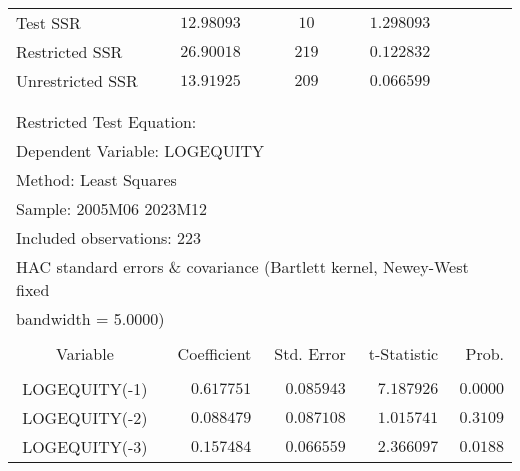 \begin{tabular}{lrrrr}
\multicolumn{1}{l}{Test SSR}&\multicolumn{1}{c}{$12.98093$}&\multicolumn{1}{c}{$10$}&\multicolumn{1}{c}{$1.298093$}&\multicolumn{1}{c}{}\\
\multicolumn{1}{l}{Restricted SSR}&\multicolumn{1}{c}{$26.90018$}&\multicolumn{1}{c}{$219$}&\multicolumn{1}{c}{$0.122832$}&\multicolumn{1}{c}{}\\
\multicolumn{1}{l}{Unrestricted SSR}&\multicolumn{1}{c}{$13.91925$}&\multicolumn{1}{c}{$209$}&\multicolumn{1}{c}{$0.066599$}&\multicolumn{1}{c}{}\\
[4.5pt] \hline \\ [-4.5pt]
\multicolumn{1}{c}{}&\multicolumn{1}{c}{}&\multicolumn{1}{c}{}&\multicolumn{1}{c}{}&\multicolumn{1}{c}{}\\
\multicolumn{2}{l}{Restricted Test Equation:}&\multicolumn{1}{c}{}&\multicolumn{1}{c}{}&\multicolumn{1}{c}{}\\
\multicolumn{3}{l}{Dependent Variable: LOGEQUITY}&\multicolumn{1}{c}{}&\multicolumn{1}{c}{}\\
\multicolumn{2}{l}{Method: Least Squares}&\multicolumn{1}{c}{}&\multicolumn{1}{c}{}&\multicolumn{1}{c}{}\\
\multicolumn{2}{l}{Sample: 2005M06 2023M12}&\multicolumn{1}{c}{}&\multicolumn{1}{c}{}&\multicolumn{1}{c}{}\\
\multicolumn{2}{l}{Included observations: 223}&\multicolumn{1}{c}{}&\multicolumn{1}{c}{}&\multicolumn{1}{c}{}\\
\multicolumn{6}{l}{HAC standard errors \& covariance (Bartlett kernel, Newey-West fixed}\\
\multicolumn{2}{l}{bandwidth = 5.0000)}&\multicolumn{1}{c}{}&\multicolumn{1}{c}{}&\multicolumn{1}{c}{}\\
[4.5pt] \hline \\ [-4.5pt]
\multicolumn{1}{c}{Variable}&\multicolumn{1}{r}{Coefficient}&\multicolumn{1}{r}{Std. Error}&\multicolumn{1}{r}{t-Statistic}&\multicolumn{1}{r}{Prob.}\\
[4.5pt] \hline \\ [-4.5pt]
\multicolumn{1}{c}{LOGEQUITY(-1)}&\multicolumn{1}{r}{$0.617751$}&\multicolumn{1}{r}{$0.085943$}&\multicolumn{1}{r}{$7.187926$}&\multicolumn{1}{r}{$0.0000$}\\
\multicolumn{1}{c}{LOGEQUITY(-2)}&\multicolumn{1}{r}{$0.088479$}&\multicolumn{1}{r}{$0.087108$}&\multicolumn{1}{r}{$1.015741$}&\multicolumn{1}{r}{$0.3109$}\\
\multicolumn{1}{c}{LOGEQUITY(-3)}&\multicolumn{1}{r}{$0.157484$}&\multicolumn{1}{r}{$0.066559$}&\multicolumn{1}{r}{$2.366097$}&\multicolumn{1}{r}{$0.0188$}\\

\end{tabular}
